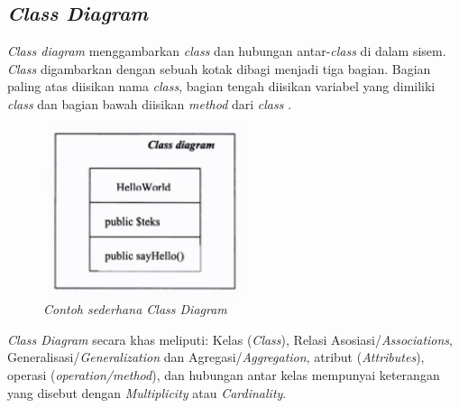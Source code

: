 \subsection{\emph{Class Diagram}}

\textit{Class diagram} menggambarkan \textit{class} dan hubungan antar-\textit{class} di dalam sisem. 
\textit{Class} digambarkan dengan sebuah kotak dibagi menjadi tiga bagian. Bagian paling atas diisikan nama \textit{class}, 
bagian tengah diisikan variabel yang dimiliki \textit{class} dan bagian bawah diisikan \textit{method} dari \textit{class} \cite{Azis}.

\begin{figure}[H]
	\centering
	\includegraphics[width=6cm,height=5cm]{gambar/contohclass}
	\caption{\textit{Contoh sederhana \textit{Class Diagram}}}
	\label{contoh_class}
\end{figure}

\textit{Class Diagram} secara khas meliputi: Kelas (\textit{Class}), Relasi Asosiasi/\textit{Associations}, Generalisasi/\textit{Generalization} dan Agregasi/\textit{Aggregation}, atribut (\textit{Attributes}), 
operasi (\textit{operation/method}), dan hubungan antar kelas mempunyai keterangan yang disebut dengan \textit{Multiplicity}
atau \textit{Cardinality}.

